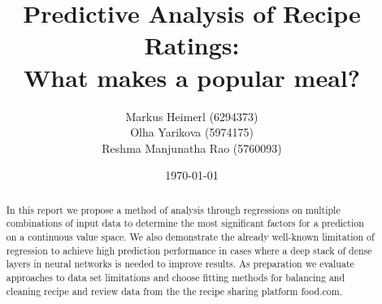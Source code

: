 \documentclass{article}
\title{Predictive Analysis of Recipe Ratings: \\What makes a popular meal?}
\author{Markus Heimerl (6294373)\\Olha Yarikova (5974175)\\Reshma Manjunatha Rao (5760093)}
\date{\today}
\begin{document}
\maketitle

\begin{abstract}


In this report we propose a method of analysis through regressions on multiple combinations of input data to determine the most significant factors for a prediction on a continuous value space. We also demonstrate the already well-known limitation of regression to achieve high prediction performance in cases where a deep stack of dense layers in neural networks is needed to improve results. As preparation we evaluate approaches to data set limitations and choose fitting methods for balancing and cleaning recipe and review data from the the recipe sharing platform food.com.

\end{abstract}
\end{document}
